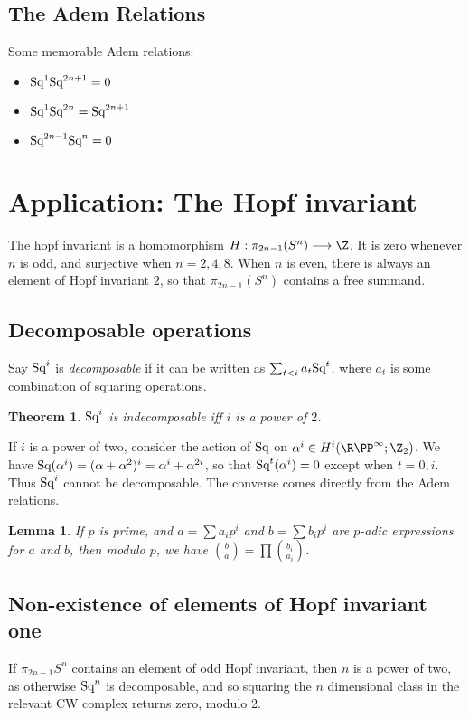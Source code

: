 \documentclass[11pt]{article}
\newcommand{\Squ}{\textup{Sq}}
\theoremstyle{plain}
\newtheorem*{thm*}{Theorem}
\newtheorem*{lem*}{Lemma}
\theoremstyle{definition}
\renewcommand{\to}{\longrightarrow}
\newcommand{\RP}{{\R\PP}}
\newcommand{\squishlist}{
  \setlength{\itemsep}{1pt}
  \setlength{\parskip}{0pt}
  \setlength{\parsep}{0pt}
}
\begin{document}
\subsection{The Adem Relations}
Some memorable Adem relations:
\begin{itemize}
\squishlist
\item $\Squ^1\Squ^{2n+1}=0$
\item $\Squ^1\Squ^{2n}=\Squ^{2n+1}$
\item $\Squ^{2n-1}\Squ^{n}=0$
\end{itemize}

\section{Application: The Hopf invariant}
The hopf invariant is a homomorphism $H:\pi_{2n-1}(S^n)\to\Z$. It is zero whenever $n$ is odd, and surjective when $n=2,4,8$. When $n$ is even, there is always an element of Hopf invariant $2$, so that $\pi_{2n-1}(S^n)$ contains a free summand.
\setcounter{subsection}{1}
\subsection{Decomposable operations}
Say $\Squ^i$ is \emph{decomposable} if it can be written as $\sum_{t<i}a_t\Squ^t$, where $a_t$ is some combination of squaring operations.
\begin{thm*}
$\Squ^i$ is indecomposable iff $i$ is a power of $2$.
\end{thm*}
If $i$ is a power of two, consider the action of $\Squ$ on $\alpha^i\in H^i(\RP^\infty;\Z_2)$. We have $\Squ(\alpha^i)=(\alpha+\alpha^2)^i=\alpha^i+\alpha^{2i}$, so that $\Squ^t(\alpha^i)=0$ except when $t=0,i$. Thus $\Squ^i$ cannot be decomposable. The converse comes directly from the Adem relations.
\begin{lem*}
If $p$ is prime, and $a=\sum a_ip^i$ and $b=\sum b_ip^i$ are $p$-adic expressions for $a$ and $b$, then modulo $p$, we have ${b\choose a}=\prod{b_i\choose a_i}$.
\end{lem*}
\subsection{Non-existence of elements of Hopf invariant one}
If $\pi_{2n-1}S^n$ contains an element of odd Hopf invariant, then $n$ is a power of two, as otherwise $\Squ^n$ is decomposable, and so squaring the $n$ dimensional class in the relevant CW complex returns zero, modulo 2.
\end{document}
